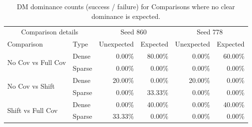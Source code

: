 \begin{table}
\caption{DM dominance counts (success / failure) for Comparisons where no clear dominance is expected.}
\begin{tabular}{llrrrr}
\toprule
\multicolumn{2}{c}{Comparison details} & \multicolumn{2}{c}{Seed 860} & \multicolumn{2}{c}{Seed 778} \\
\cmidrule(lr){1-2}\cmidrule(lr){3-4}\cmidrule(lr){5-6}
Comparison & Type & Unexpected & Expected & Unexpected & Expected \\
\midrule
\multirow[t]{2}{*}{No Cov vs Full Cov} & Dense & 0.00\% & 80.00\% & 0.00\% & 60.00\% \\
 & Sparse & 0.00\% & 0.00\% & 0.00\% & 0.00\% \\
\cline{1-6}
\multirow[t]{2}{*}{No Cov vs Shift} & Dense & 20.00\% & 0.00\% & 20.00\% & 0.00\% \\
 & Sparse & 0.00\% & 33.33\% & 0.00\% & 0.00\% \\
\cline{1-6}
\multirow[t]{2}{*}{Shift vs Full Cov} & Dense & 0.00\% & 40.00\% & 0.00\% & 40.00\% \\
 & Sparse & 33.33\% & 0.00\% & 0.00\% & 0.00\% \\
\cline{1-6}
\bottomrule
\end{tabular}
\end{table}
